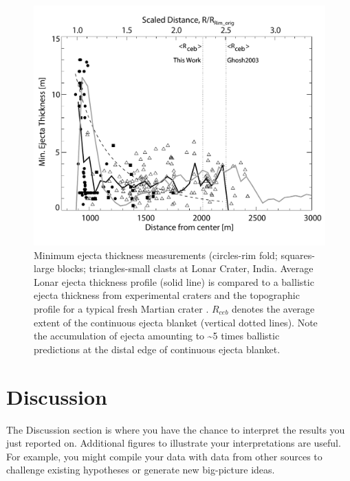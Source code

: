 \documentclass[11pt]{report}
\begin{document}
\begin{figure}[h!]
  \centering \includegraphics[width=5in]{Figures/example-results.pdf}
\caption[Short title for this figure that fits on a line]{\small{Minimum ejecta thickness measurements (circles-rim fold; squares-large blocks; triangles-small clasts at Lonar Crater, India. Average Lonar ejecta thickness profile (solid line) is compared to a ballistic ejecta thickness from experimental craters \cite[dashed line][]{Mcgetchin73} and the topographic profile for a typical fresh Martian crater \citep[grey line, scaled to Earth][]{StewartValiant06}. $R_{ceb}$ denotes the average extent of the continuous ejecta blanket (vertical dotted lines).  Note the accumulation of ejecta amounting to \textasciitilde{}5 times ballistic predictions at the distal edge of continuous ejecta blanket. \label{fig:ejecta}}}
\end{figure}

\section{Discussion \label{sec:discussion}}
The Discussion section is where you have the chance to interpret the results you just reported on. Additional figures to illustrate your interpretations are useful. For example, you might compile your data with data from other sources  to challenge existing hypotheses or generate new big-picture ideas.
\end{document}
